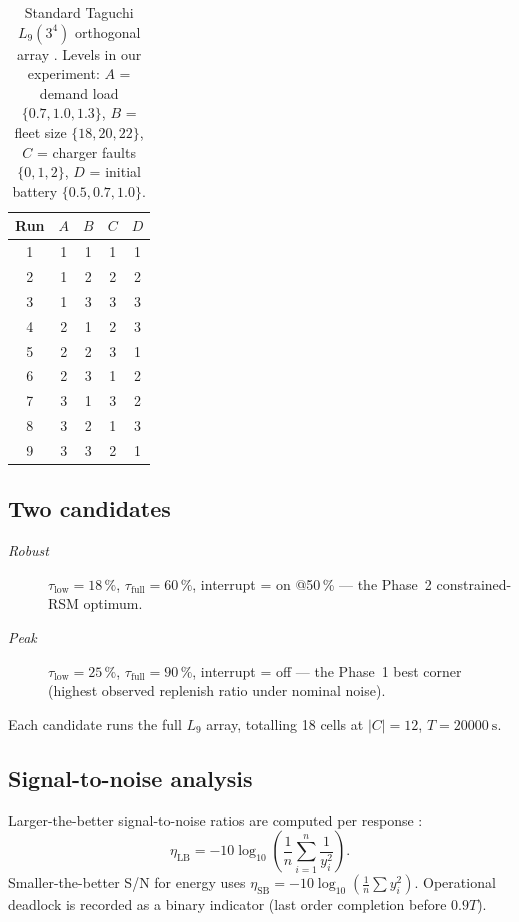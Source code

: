 \documentclass[conference]{IEEEtran}
\begin{document}
\begin{table}[t]
  \centering
  \caption{Standard Taguchi $L_9(3^4)$ orthogonal array \cite{taguchi1986,ross1996}. Levels in our experiment: $A$ = demand load $\{0.7, 1.0, 1.3\}$, $B$ = fleet size $\{18, 20, 22\}$, $C$ = charger faults $\{0, 1, 2\}$, $D$ = initial battery $\{0.5, 0.7, 1.0\}$.}
  \label{tab:L9}
  \small
  \begin{tabular}{ccccc}
    \toprule
    Run & $A$ & $B$ & $C$ & $D$ \\
    \midrule
    1 & 1 & 1 & 1 & 1 \\
    2 & 1 & 2 & 2 & 2 \\
    3 & 1 & 3 & 3 & 3 \\
    4 & 2 & 1 & 2 & 3 \\
    5 & 2 & 2 & 3 & 1 \\
    6 & 2 & 3 & 1 & 2 \\
    7 & 3 & 1 & 3 & 2 \\
    8 & 3 & 2 & 1 & 3 \\
    9 & 3 & 3 & 2 & 1 \\
    \bottomrule
  \end{tabular}
\end{table}

\subsection{Two candidates}
\begin{description}
  \item[\emph{Robust}] $\tau_\text{low} = 18\,\%$, $\tau_\text{full} = 60\,\%$, interrupt = on @50\,\% --- the Phase~2 constrained-RSM optimum.
  \item[\emph{Peak}] $\tau_\text{low} = 25\,\%$, $\tau_\text{full} = 90\,\%$, interrupt = off --- the Phase~1 best corner (highest observed replenish ratio under nominal noise).
\end{description}
Each candidate runs the full $L_9$ array, totalling 18 cells at $|C| = 12$, $T = \SI{20000}{\second}$.

\subsection{Signal-to-noise analysis}
Larger-the-better signal-to-noise ratios are computed per response \cite{taguchi1986}:
\begin{equation}
  \eta_\text{LB} = -10 \log_{10}\left(\frac{1}{n}\sum_{i=1}^{n}\frac{1}{y_i^2}\right).
\end{equation}
Smaller-the-better S/N for energy uses $\eta_\text{SB} = -10 \log_{10}(\frac{1}{n}\sum y_i^2)$. Operational deadlock is recorded as a binary indicator (last order completion before $0.9 T$).
\end{document}
